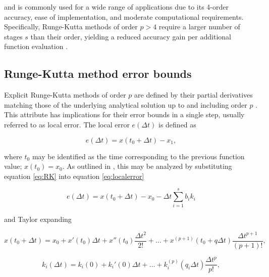 \noindent and is commonly used for a wide range of applications due to its 4-order accuracy, ease of implementation, and moderate computational requirements. Specifically, Runge-Kutta methods of order $p>4$ require a larger number of stages $s$ than their order, yielding a reduced accuracy gain per additional function evaluation \citep{SolvingODEs}. %

\subsection{Runge-Kutta method error bounds}\label{sec:RKerrorbounds}

Explicit Runge-Kutta methods of order $p$ are defined by their partial derivatives matching those of the underlying analytical solution up to and including order $p$ \citep{SolvingODEs}. This attribute has implications for their error bounds in a single step, usually referred to as local error. The local error $e(\Delta t)$ is defined as

\begin{equation} \label{eq:localerror}
	e(\Delta t) = x(t_0+\Delta t)-x_1,
\end{equation}

\noindent where $t_0$ may be identified as the time corresponding to the previous function value; $x(t_0)=x_0$. As outlined in \cite{Bieberbach51}, this may be analyzed by substituting equation \eqref{eq:RK} into equation \eqref{eq:localerror}

\begin{equation}
e(\Delta t) = x(t_0+\Delta t)-x_0-\Delta t\sum_{i=1}^{s}b_ik_i 
\end{equation}

\noindent and Taylor expanding

\begin{equation} \label{eq:Taylor_y}
x(t_0+\Delta t)=x_0+x'(t_0)\Delta t+x''(t_0)\frac{\Delta t^2}{2!}+\ldots+x^{(p+1)}(t_0+q\Delta t)\frac{\Delta t^{p+1}}{(p+1)!},
\end{equation}

\begin{equation} \label{eq:Taylor_k}
k_i(\Delta t) = k_i(0)+k_i'(0)\Delta t+\ldots+k_i^{(p)}(q_i\Delta t)\frac{\Delta t^p}{p!},
\end{equation}

